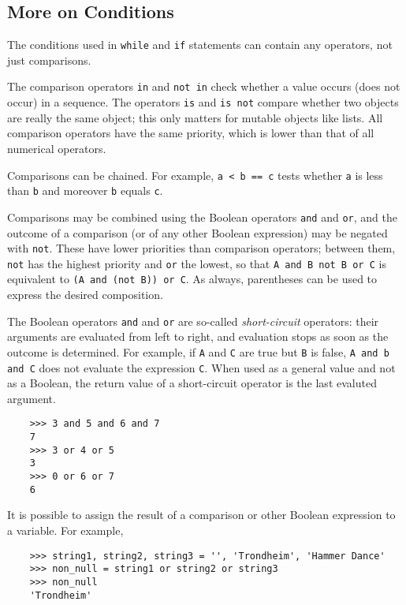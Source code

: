\documentclass[UTF8]{article}
\begin{document}
\subsection{More on Conditions}
The conditions used in \texttt{while} and \texttt{if} statements can contain any operators, not
just comparisons.

The comparison operators \texttt{in} and \texttt{not in} check whether a value occurs (does not
occur) in a sequence. The operators \texttt{is} and \texttt{is not} compare whether two objects are
really the same object; this only matters for mutable objects like lists. All comparison operators
have the same priority, which is lower than that of all numerical operators.

Comparisons can be chained. For example, \texttt{a < b == c} tests whether \texttt{a} is less than
\texttt{b} and moreover \texttt{b} equals \texttt{c}.

Comparisons may be combined using the Boolean operators \texttt{and} and \texttt{or}, and the
outcome of a comparison (or of any other Boolean expression) may be negated with \texttt{not}.
These have lower priorities than comparison operators; between them, \texttt{not} has the highest
priority and \texttt{or} the lowest, so that \texttt{A and B not B or C} is equivalent to
\texttt{(A and (not B)) or C}. As always, parentheses can be used to express the desired
composition.

The Boolean operators \texttt{and} and \texttt{or} are so-called \emph{short-circuit} operators:
their arguments are evaluated from left to right, and evaluation stops as soon as the outcome is
determined. For example, if \texttt{A} and \texttt{C} are true but \texttt{B} is false,
\texttt{A and b and C} does not evaluate the expression \texttt{C}. When used as a general value
and not as a Boolean, the return value of a short-circuit operator is the last evaluted argument.

\begin{verbatim}
    >>> 3 and 5 and 6 and 7
    7
    >>> 3 or 4 or 5
    3
    >>> 0 or 6 or 7
    6
\end{verbatim}

It is possible to assign the result of a comparison or other Boolean expression to a variable. For
example,
\begin{verbatim}
    >>> string1, string2, string3 = '', 'Trondheim', 'Hammer Dance'
    >>> non_null = string1 or string2 or string3
    >>> non_null
    'Trondheim'
\end{verbatim}
\end{document}
